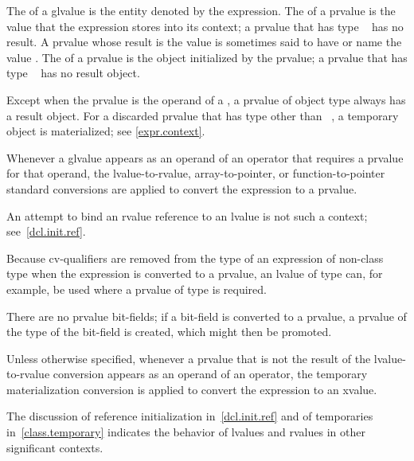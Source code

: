 \pnum
The  of a glvalue is the entity denoted by the expression.
The  of a prvalue
is the value that the expression stores into its context;
a prvalue that has type \cv{}~ has no result.
A prvalue whose result is the value 
is sometimes said to have or name the value .
The  of a prvalue is the object initialized by the prvalue;
a prvalue that has type \cv{}~
has no result object.
\begin{note}
Except when the prvalue is the operand of a ,
a prvalue of object type always has a result object.
For a discarded prvalue that has type other than \cv{}~,
a temporary object is materialized; see \ref{expr.context}.
\end{note}

\pnum
Whenever a glvalue appears as an operand of an operator that
requires a prvalue for that operand, the
lvalue-to-rvalue, array-to-pointer,
or function-to-pointer standard conversions are
applied to convert the expression to a prvalue.
\begin{note}
An attempt to bind an rvalue reference to an lvalue is not such a context; see~\ref{dcl.init.ref}.
\end{note}
\begin{note}
Because cv-qualifiers are removed from the type of an expression of
non-class type when the expression is converted to a prvalue, an lvalue
of type  can, for example, be used where
a prvalue of type  is required.
\end{note}
\begin{note}
There are no prvalue bit-fields; if a bit-field is converted to a
prvalue, a prvalue of the type of the bit-field is
created, which might then be promoted.
\end{note}

\pnum
Unless otherwise specified,
whenever a prvalue
that is not the result of the lvalue-to-rvalue conversion
appears as an operand of an operator,
the temporary materialization conversion is
applied to convert the expression to an xvalue.

\pnum
\begin{note}
The discussion of reference initialization in~\ref{dcl.init.ref} and of
temporaries in~\ref{class.temporary} indicates the behavior of lvalues
and rvalues in other significant contexts.
\end{note}

